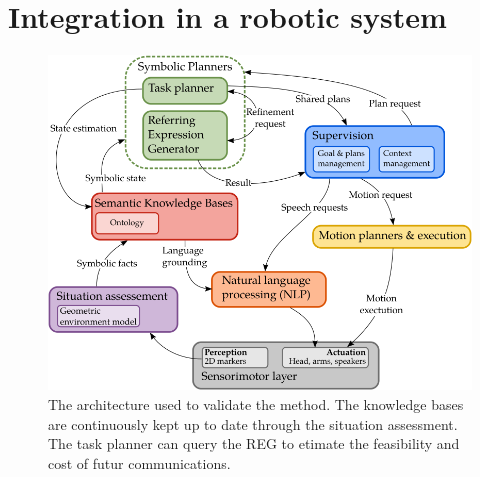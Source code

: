 \section{Integration in a robotic system}

\begin{figure}[h!]
\centering
\includegraphics[scale=0.6]{figures/chapter5/architecture.png}
\caption{\label{fig:chap4_archi} The architecture used to validate the method. The knowledge bases are continuously kept up to date through the situation assessment. The task planner can query the REG to etimate the feasibility and cost of futur communications. }
\end{figure}